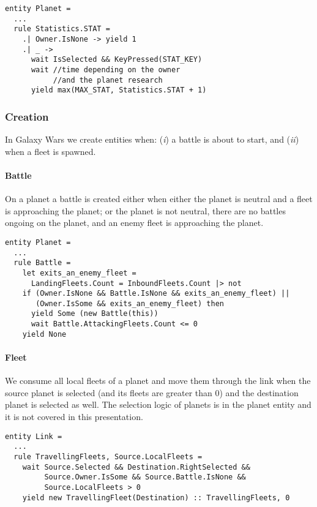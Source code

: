 \begin{lstlisting}
entity Planet = 
  ...
  rule Statistics.STAT =
    .| Owner.IsNone -> yield 1
    .| _ ->
      wait IsSelected && KeyPressed(STAT_KEY)
      wait //time depending on the owner
           //and the planet research
      yield max(MAX_STAT, Statistics.STAT + 1)
\end{lstlisting}


\subsubsection{Creation}
In Galaxy Wars we create entities when: (\textit{i}) a battle is about to start, and (\textit{ii}) when a fleet is spawned.

\paragraph{Battle} On a planet a battle is created either when either the planet is neutral and a fleet is approaching the planet; or the planet is not neutral, there are no battles ongoing on the planet, and an enemy fleet is approaching the planet.
\begin{lstlisting}
entity Planet =
  ...
  rule Battle =
	let exits_an_enemy_fleet = 
	  LandingFleets.Count = InboundFleets.Count |> not
    if (Owner.IsNone && Battle.IsNone && exits_an_enemy_fleet) ||
       (Owner.IsSome && exits_an_enemy_fleet) then
      yield Some (new Battle(this))
      wait Battle.AttackingFleets.Count <= 0
    yield None
\end{lstlisting}


\paragraph{Fleet}
We consume all local fleets of a planet and move them through the link when the source planet is selected (and its fleets are greater than 0) and the destination planet is selected as well. The selection logic of planets is in the planet entity and it is not covered in this presentation.

\begin{lstlisting}
entity Link =
  ...
  rule TravellingFleets, Source.LocalFleets = 
    wait Source.Selected && Destination.RightSelected &&
         Source.Owner.IsSome && Source.Battle.IsNone &&
         Source.LocalFleets > 0		
    yield new TravellingFleet(Destination) :: TravellingFleets, 0
\end{lstlisting}

